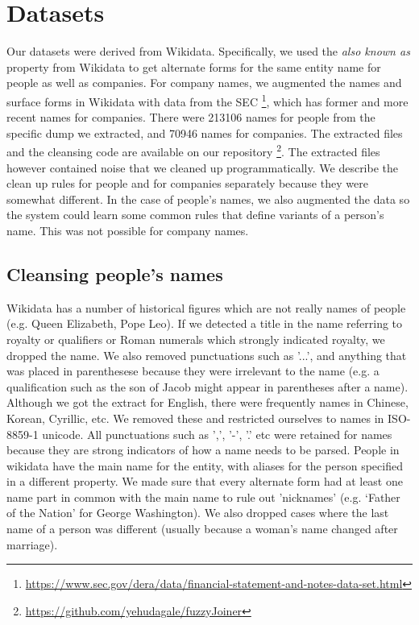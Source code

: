 \section{Datasets}
\label{datasets}
Our datasets were derived from Wikidata.  Specifically, we used the \textit{also known as} property from Wikidata to get alternate forms for the same entity name for people as well as companies.  For company names, we augmented the names and surface forms in Wikidata with data from the SEC \footnote{\url{https://www.sec.gov/dera/data/financial-statement-and-notes-data-set.html}}, which has former and more recent names for companies.  There were 213106 names for people from the specific dump we extracted, and 70946 names for companies.  The extracted files and the cleansing code are available on our repository \footnote{\url{https://github.com/yehudagale/fuzzyJoiner}}. The extracted files however contained noise that we cleaned up programmatically.  We describe the clean up rules for people and for companies separately because they were somewhat different.  In the case of people's names, we also augmented the data so the system could learn some common rules that define variants of a person's name.  This was not possible for company names.

\subsection{Cleansing people's names}
Wikidata has a number of historical figures which are not really names of people (e.g. Queen Elizabeth, Pope Leo).  If we detected a title in the name referring to royalty or qualifiers or Roman numerals which strongly indicated royalty, we dropped the name.  We also removed punctuations such as '...', and anything that was placed in parenthesese because they were irrelevant to the name (e.g. a qualification such as the son of Jacob might appear in parentheses after a name).  Although we got the extract for English, there were frequently names in Chinese, Korean, Cyrillic, etc.  We removed these and restricted ourselves to names in ISO-8859-1 unicode.  All punctuations such as ',', '-', '.' etc were retained for names because they are strong indicators of how a name needs to be parsed.  People in wikidata have the main name for the entity, with aliases for the person specified in a different property.  We made sure that every alternate form had at least one name part in common with the main name to rule out 'nicknames' (e.g. `Father of the Nation' for George Washington).  We also dropped cases where the last name of a person was different (usually because a woman's name changed after marriage).      

